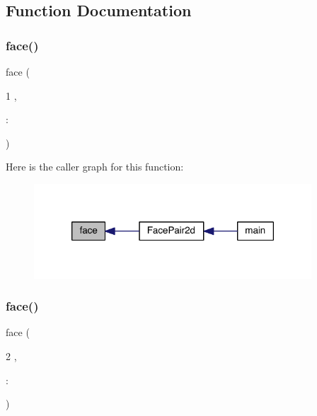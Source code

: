 \subsection{Function Documentation}
\mbox{\label{a00605_a9109c446b437fff787b51f7eb55988c3}} 
\subsubsection{\texorpdfstring{face()}{face()}\hspace{0.1cm}{\footnotesize\ttfamily [1/4]}}
{\footnotesize\ttfamily face (\begin{DoxyParamCaption}\item[{1}]{,  }\item[{\+:}]{ }\end{DoxyParamCaption})}

Here is the caller graph for this function\+:\nopagebreak
\begin{figure}[H]
\begin{center}
\leavevmode
\includegraphics[width=294pt]{a00605_a9109c446b437fff787b51f7eb55988c3_icgraph}
\end{center}
\end{figure}
\mbox{\label{a00605_ac5bf1b71e187f9509de1f13415fadd23}} 
\subsubsection{\texorpdfstring{face()}{face()}\hspace{0.1cm}{\footnotesize\ttfamily [2/4]}}
{\footnotesize\ttfamily face (\begin{DoxyParamCaption}\item[{2}]{,  }\item[{\+:}]{ }\end{DoxyParamCaption})}

\mbox{\label{a00605_a2f070a21ac519a099c6eb56f4902f34e}} 

